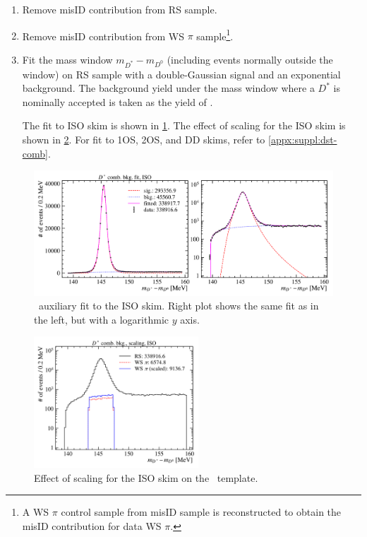 \begin{enumerate}
    \item Remove misID contribution from RS sample.
    \item Remove misID contribution from WS $\pi$ sample\footnote{
            A WS $\pi$ control sample from misID sample is reconstructed to
            obtain the misID contribution for data WS $\pi$.
        }.
    \item Fit the mass window $m_{D^*} - m_{D^0}$ (including events normally
        outside the window) on RS sample with a
        double-Gaussian signal and an exponential background.
        The background yield under the mass window where a $D^*$ is nominally
        accepted is taken as the yield of \DstComb.

        The fit to ISO skim is shown in \cref{fig:dst-comb-fit}.
        The effect of scaling for the ISO skim is shown in
        \cref{fig:dst-comb-scale}.
        For fit to 1OS, 2OS, and DD skims, refer to \cref{appx:suppl:dst-comb}.
\end{enumerate}


\begin{figure}[!htb]
    \centering
    \includegraphics[width=\textwidth]{figs-fit-fit-templates/data-driven-plots/dst_comb/fit_dst_comb_iso_comb.pdf}
    \caption{
        \DstComb\ auxiliary fit to the ISO skim.
        Right plot shows the same fit as in the left, but with a logarithmic $y$
        axis.
    }
    \label{fig:dst-comb-fit}
\end{figure}

\begin{figure}[!htb]
    \centering
    \includegraphics[width=0.55\textwidth]{figs-fit-fit-templates/data-driven-plots/dst_comb/fit_dst_comb_scaled_comp_iso_log.pdf}
    \caption{
        Effect of scaling for the ISO skim on the \DstComb\ template.
    }
    \label{fig:dst-comb-scale}
\end{figure}

